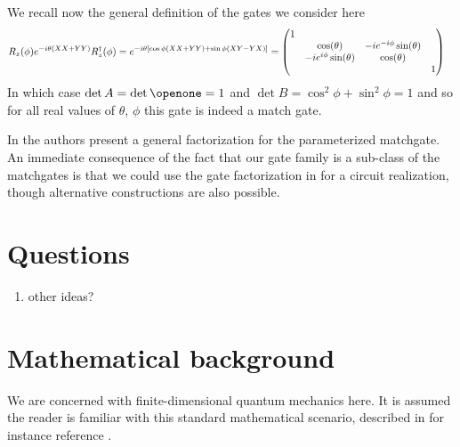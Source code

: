 \documentclass[aps,pra,12pt,nofootinbib,superscriptaddress,longbibliography,showpacs]{revtex4-1}
\theoremstyle{plain}
\theoremstyle{definition}
\newcommand{\I}{\openone}     %
\begin{document}
We recall now the general definition of the gates we consider here 
\begin{align}
\notag
R_z(\phi)e^{-i\theta(XX+YY)}R^\dagger_z(\phi) &= e^{-i \theta[\cos\phi(XX+YY)+\sin\phi(XY-YX)] }
= 
\begin{pmatrix}
1\\
& \cos(\theta) &  -ie^{-i\phi}\sin(\theta)\\
& -ie^{i\phi}\sin(\theta) & \cos(\theta)\\
& & & 1
\end{pmatrix}
\end{align}
In which case $\det A=\det\I=1$ and $\det B = \cos^2\phi + \sin^2\phi =1$ and so for all real values of $\theta$, $\phi$ this gate is indeed a match gate. 

In \cite{RFSW10} the authors present a general factorization for the parameterized matchgate. An immediate consequence of the fact that our gate family is a sub-class of the matchgates is that we could use the gate factorization in \cite{RFSW10} for a circuit realization, though alternative constructions are also possible. 




\section{Questions}

\begin{enumerate} 
\item other ideas?   
\end{enumerate} 



\appendix
\section{Mathematical background}

We are concerned with finite-dimensional quantum mechanics here. It is
assumed the reader is familiar with this standard mathematical
scenario, described in for instance reference \cite{s}.
\end{document}

